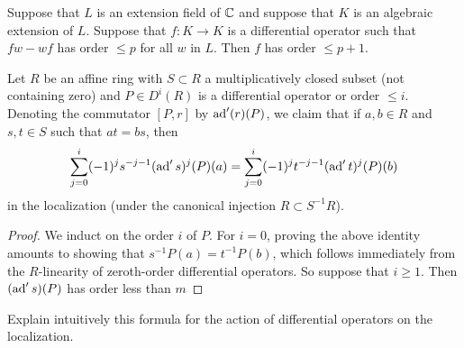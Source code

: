 \begin{corollary}
    Suppose that $L$ is an extension field of $\mathbb{C}$ and suppose that $K$ is an algebraic
    extension of $L$. Suppose that $f:K\to K$ is a differential operator such that $fw-wf$
    has order $\leqslant p$ for all $w$ in $L$. Then $f$ has order $\leqslant p+1$.
\end{corollary}

\begin{lemma}
    Let $R$ be an affine ring with $S\subset R$ a multiplicatively closed subset
    (not containing zero) and $P\in D^i(R)$ is a differential operator or order $\leqslant i$.
    Denoting the commutator $[P,r]$ by $\operatorname{ad}'(r)(P)$, we claim that if $a,b\in R$
    and $s,t\in S$ such that $at=bs$, then 
    \begin{equation}
        \sum_{j=0}^i(-1)^js^{-j-1}(\operatorname{ad}'s)^j(P)(a) = \sum_{j=0}^i (-1)^jt^{-j-1}(\operatorname{ad}'t)^j(P)(b)
        \label{eq:loc_diff}
    \end{equation}
    in the localization (under the canonical injection $R\subset S^{-1}R$).
    \label{hart:lemma2}
\end{lemma}
\begin{proof}
    We induct on the order $i$ of $P$. For $i=0$, proving the above identity amounts to
    showing that $s^{-1}P(a)=t^{-1}P(b)$, which follows immediately from the $R$-linearity
    of zeroth-order differential operators. So suppose that $i\geqslant 1$. Then $(\operatorname{ad}'s)(P)$
    has order less than $m$
\end{proof}

\begin{remark}
    Explain intuitively this formula for the action of differential operators on the
    localization.
\end{remark}


